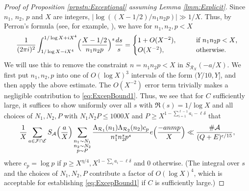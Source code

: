 \documentclass[10pt]{amsart}
\theoremstyle{plain}
\numberwithin{sblmm}{thrm}
\numberwithin{equation}{section}
\begin{document}
\begin{proof}[Proof of Proposition \ref{prpstn:Exceptional} assuming  Lemma \ref{lmm:Explicit}]
Since $n_1$, $n_2$, $p$ and $X$ are integers, $|\log{((X-1/2)/n_1n_2p)}|\gg 1/X$. Thus, by Perron's formula (see, for example, \cite[Chapter 17]{Davenport}), we have for $n_1,n_2,p<X$
\begin{align*}
\frac{1}{(2\pi i)^2}\int_{1/\log{X}-i X^4}^{1/\log{X}+i X^4}\Bigl(\frac{X-1/2}{n_1n_2p}\Bigr)^{s}\frac{d s}{s}
=\begin{cases}
1+O(X^{-2}),\qquad &\text{if $n_1n_2p< X$,}\\
O(X^{-2}), &\text{otherwise.}
\end{cases}
\end{align*}
We will use this to remove the constraint $n=n_1n_2p<X$ in $S_{\mathcal{R}_X}(-a/X)$. We first put $n_1,n_2,p$ into one of $O(\log{X})^3$ intervals of the form $(Y/10,Y]$, and then apply the above estimate. The $O(X^{-2})$ error term trivially makes a negligible contribution to \eqref{eq:ExcepBound1}. Thus, %
 we see that for $C$ sufficiently large, it suffices to show uniformly over all $s$ with $\Re(s)=1/\log{X}$ and all choices of $N_1,N_2,P$ with $N_1N_2P\le 1000 X$ and $P\ge X^{1-\sum_{i=1}^{\ell-1} a_i-\ell\delta}$ that
%
\begin{align*}
\frac{1}{X}\sum_{a\in\mathcal{F}\cap\mathcal{E}}S_{\mathcal{A}}\Bigl(\frac{a}{X}\Bigr)\sum_{\substack{n_1\sim N_1\\ n_2\sim N_2\\ p\sim P}}\frac{\Lambda_{\mathcal{R}_1}(n_1)\Lambda_{\mathcal{R}_2}(n_2)c_p}{n_1^s n_2^s p^s} e\Bigl(\frac{-an m p}{X}\Bigr)
\ll \frac{\#\mathcal{A}}{(Q+E)^{\epsilon/15}},
\end{align*}
where $c_p=\log{p}$ if $p\ge X^{\eta/4},X^{1-\sum_i a_i-\ell\delta}$ and 0 otherwise. (The integral over $s$ and the choices of $N_1,N_2,P$ contribute a factor of $O(\log{X})^4$, which is acceptable for establishing \eqref{eq:ExcepBound1} if $C$ is sufficiently large.) 


\end{proof}
\end{document}
